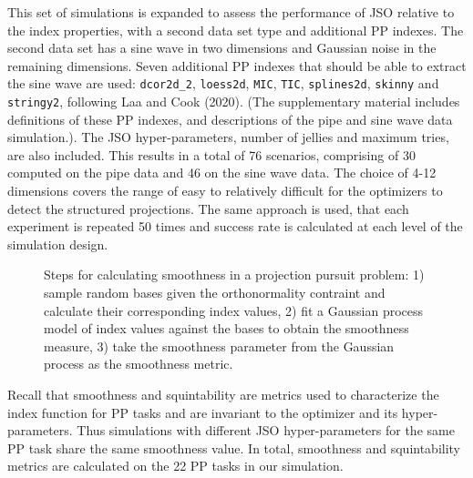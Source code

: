 \documentclass[
  12pt,
]{interact}
\theoremstyle{plain}
\begin{document}
This set of simulations is expanded to assess the performance of JSO
relative to the index properties, with a second data set type and
additional PP indexes. The second data set has a sine wave in two
dimensions and Gaussian noise in the remaining dimensions. Seven
additional PP indexes that should be able to extract the sine wave are
used: \texttt{dcor2d\_2}, \texttt{loess2d}, \texttt{MIC}, \texttt{TIC},
\texttt{splines2d}, \texttt{skinny} and \texttt{stringy2}, following Laa
and Cook (2020). (The supplementary material includes definitions of
these PP indexes, and descriptions of the pipe and sine wave data
simulation.). The JSO hyper-parameters, number of jellies and maximum
tries, are also included. This results in a total of 76 scenarios,
comprising of 30 computed on the pipe data and 46 on the sine wave data.
The choice of 4-12 dimensions covers the range of easy to relatively
difficult for the optimizers to detect the structured projections. The
same approach is used, that each experiment is repeated 50 times and
success rate is calculated at each level of the simulation design.

\begin{figure}


\caption{\label{fig-smoothness}Steps for calculating smoothness in a
projection pursuit problem: 1) sample random bases given the
orthonormality contraint and calculate their corresponding index values,
2) fit a Gaussian process model of index values against the bases to
obtain the smoothness measure, 3) take the smoothness parameter from the
Gaussian process as the smoothness metric.}

\end{figure}%

Recall that smoothness and squintability are metrics used to
characterize the index function for PP tasks and are invariant to the
optimizer and its hyper-parameters. Thus simulations with different JSO
hyper-parameters for the same PP task share the same smoothness value.
In total, smoothness and squintability metrics are calculated on the 22
PP tasks in our simulation.
\end{document}
